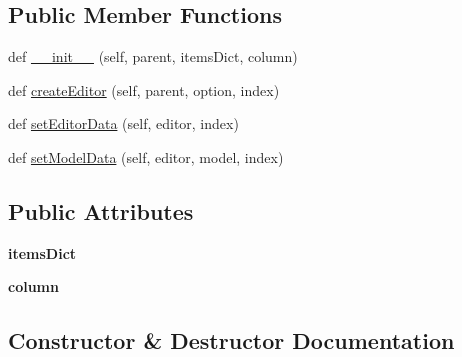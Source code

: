 \subsection*{Public Member Functions}
\begin{DoxyCompactItemize}
\item 
def \mbox{\hyperlink{class_dsg_tools_1_1_complex_tools_1_1manage_complex_1_1_list_widget_delegate_a1cf170e035823ce91d9c4bf4051e4706}{\+\_\+\+\_\+init\+\_\+\+\_\+}} (self, parent, items\+Dict, column)
\item 
def \mbox{\hyperlink{class_dsg_tools_1_1_complex_tools_1_1manage_complex_1_1_list_widget_delegate_ad6edef6695ca344a21825ddda08bb331}{create\+Editor}} (self, parent, option, index)
\item 
def \mbox{\hyperlink{class_dsg_tools_1_1_complex_tools_1_1manage_complex_1_1_list_widget_delegate_a693ea054a20f22e458a75f80dffca15b}{set\+Editor\+Data}} (self, editor, index)
\item 
def \mbox{\hyperlink{class_dsg_tools_1_1_complex_tools_1_1manage_complex_1_1_list_widget_delegate_aa63be398b10cf12cc45bb03efd49de66}{set\+Model\+Data}} (self, editor, model, index)
\end{DoxyCompactItemize}
\subsection*{Public Attributes}
\begin{DoxyCompactItemize}
\item 
\mbox{\label{class_dsg_tools_1_1_complex_tools_1_1manage_complex_1_1_list_widget_delegate_a4e961d84569ad4240520917b27eda30c}} 
{\bfseries items\+Dict}
\item 
\mbox{\label{class_dsg_tools_1_1_complex_tools_1_1manage_complex_1_1_list_widget_delegate_a9dc6f2d79380fc0de3b67467d1fa00b9}} 
{\bfseries column}
\end{DoxyCompactItemize}


\subsection{Constructor \& Destructor Documentation}
\mbox{\label{class_dsg_tools_1_1_complex_tools_1_1manage_complex_1_1_list_widget_delegate_a1cf170e035823ce91d9c4bf4051e4706}} 
